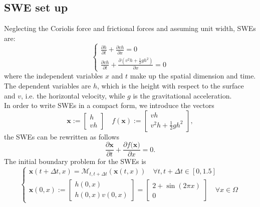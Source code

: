 \subsection{SWE set up}
Neglecting the Coriolis force and frictional forces and assuming unit width, SWEs are:
\begin{equation}
\left \{
\begin{array}{ll}
\frac{\partial h}{\partial t}+\frac{\partial vh}{\partial {x}}=0\\
\frac{\partial vh}{\partial t}+\frac{\partial (v^{2}h+\frac{1}{2}gh^{2})}{\partial {x}}=0
\end{array}
\right . 
\end{equation}
where the independent variables ${x}$ and $t$ make up the spatial dimension and time. The dependent
variables are $h$, which is the height with respect to the surface and $v$, i.e. 
the horizontal velocity, while $g$ is the gravitational acceleration.\\
In order to write  SWEs in a compact form, we introduce the vectors
\begin{equation}
\textbf{x}:=\left[\begin{array}{ll}
h\\
vh
\end{array}\right]\quad 
f(\textbf{x}):=\left[\begin{array}{ll}
vh\\
v^{2}h+\frac{1}{2}gh^{2}
\end{array}\right],
\end{equation}
the SWEs can be rewritten as follows
\begin{equation}\label{80}
\frac{\partial \textbf{x}}{\partial t}+\frac{\partial f(\textbf{x)}}{\partial {x}}=0.
\end{equation}
The initial boundary problem for the SWEs is 
\begin{equation}
\left\{\begin{array}{lllll}
\textbf{x}(t+\Delta t,x)=\mathcal{M}_{t,t+\Delta t}(\textbf{x}(t,x)) \quad \forall t, t+\Delta t \in [0,1.5]\\
\textbf{x}(0,x):=\left[\begin{array}{ll}h(0,x)\\
h(0,x)v(0,x)
\end{array}\right] =\left[\begin{array}{ll} 2+\sin(2\pi x)\\
0 \end{array} \right] \quad \forall x \in \Omega \end{array}\right.
\end{equation}
